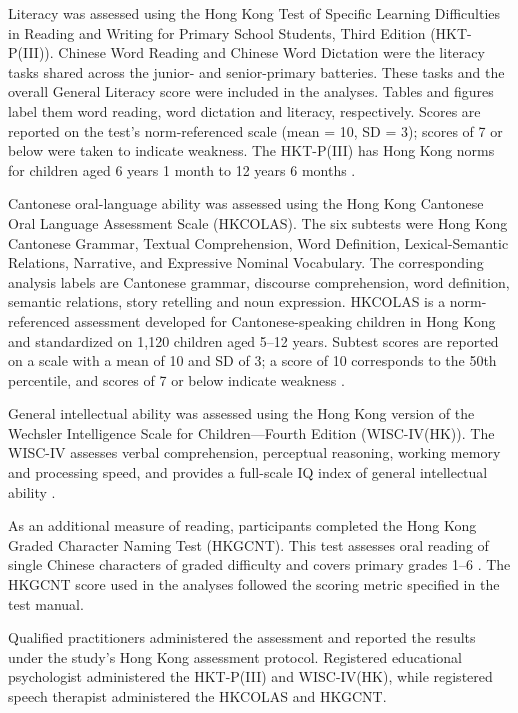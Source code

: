 Literacy was assessed using the Hong Kong Test of Specific Learning Difficulties in Reading and Writing for Primary School Students, Third Edition (HKT-P(III)). Chinese Word Reading and Chinese Word Dictation were the literacy tasks shared across the junior- and senior-primary batteries. These tasks and the overall General Literacy score were included in the analyses. Tables and figures label them word reading, word dictation and literacy, respectively. Scores are reported on the test’s norm-referenced scale (mean = 10, SD = 3); scores of 7 or below were taken to indicate weakness. The HKT-P(III) has Hong Kong norms for children aged 6 years 1 month to 12 years 6 months \cite{ho2015hong}.

Cantonese oral-language ability was assessed using the Hong Kong Cantonese Oral Language Assessment Scale (HKCOLAS). The six subtests were Hong Kong Cantonese Grammar, Textual Comprehension, Word Definition, Lexical-Semantic Relations, Narrative, and Expressive Nominal Vocabulary. The corresponding analysis labels are Cantonese grammar, discourse comprehension, word definition, semantic relations, story retelling and noun expression. HKCOLAS is a norm-referenced assessment developed for Cantonese-speaking children in Hong Kong and standardized on 1,120 children aged 5–12 years. Subtest scores are reported on a scale with a mean of 10 and SD of 3; a score of 10 corresponds to the 50th percentile, and scores of 7 or below indicate weakness \cite{t2006hong}.

General intellectual ability was assessed using the Hong Kong version of the Wechsler Intelligence Scale for Children—Fourth Edition (WISC-IV(HK)). The WISC-IV assesses verbal comprehension, perceptual reasoning, working memory and processing speed, and provides a full-scale IQ index of general intellectual ability \cite{wechsler2010hong}. 

As an additional measure of reading, participants completed the Hong Kong Graded Character Naming Test (HKGCNT). This test assesses oral reading of single Chinese characters of graded difficulty and covers primary grades 1–6 \cite{leung2008hong,mcleod2012multilingual}. The HKGCNT score used in the analyses followed the scoring metric specified in the test manual.

Qualified practitioners administered the assessment and reported the results under the study’s Hong Kong assessment protocol. Registered educational psychologist administered the HKT-P(III) and WISC-IV(HK), while registered speech therapist administered the HKCOLAS and HKGCNT. 

